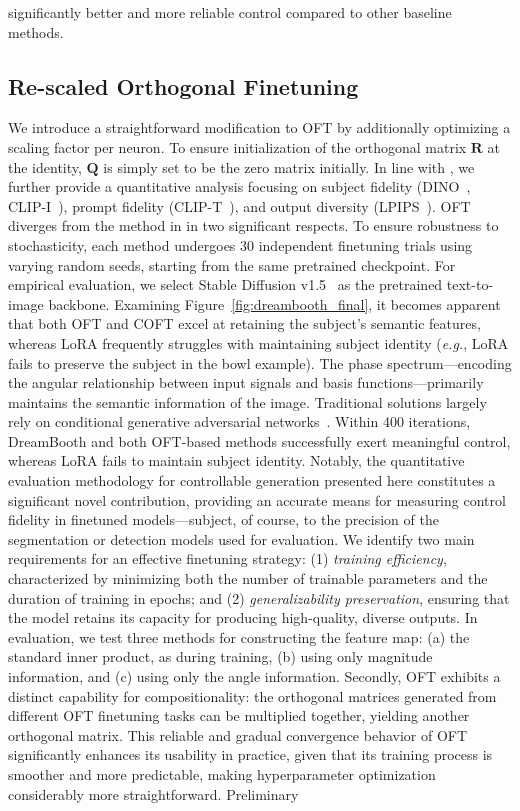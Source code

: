 {significantly better and more reliable control compared to other baseline methods. \subsection{Re-scaled Orthogonal Finetuning}

We introduce a straightforward modification to OFT by additionally optimizing a scaling factor per neuron. To ensure initialization of the orthogonal matrix $\bm{R}$ at the identity, $\bm{Q}$ is simply set to be the zero matrix initially. In line with \cite{ruiz2023dreambooth}, we further provide a quantitative analysis focusing on subject fidelity (DINO~\cite{caron2021emerging}, CLIP-I~\cite{radford2021learning}), prompt fidelity (CLIP-T~\cite{radford2021learning}), and output diversity (LPIPS~\cite{zhang2018unreasonable}). OFT diverges from the method in \cite{liu2021orthogonal} in two significant respects. To ensure robustness to stochasticity, each method undergoes 30 independent finetuning trials using varying random seeds, starting from the same pretrained checkpoint. For empirical evaluation, we select Stable Diffusion v1.5~\cite{rombach2022high} as the pretrained text-to-image backbone. Examining Figure~\ref{fig:dreambooth_final}, it becomes apparent that both OFT and COFT excel at retaining the subject's semantic features, whereas LoRA frequently struggles with maintaining subject identity (\emph{e.g.}, LoRA fails to preserve the subject in the bowl example). The phase spectrum—encoding the angular relationship between input signals and basis functions—primarily maintains the semantic information of the image. Traditional solutions largely rely on conditional generative adversarial networks~\cite{isola2017image,zhu2017toward,wang2018high,park2019semantic,choi2018stargan}. Within 400 iterations, DreamBooth and both OFT-based methods successfully exert meaningful control, whereas LoRA fails to maintain subject identity. Notably, the quantitative evaluation methodology for controllable generation presented here constitutes a significant novel contribution, providing an accurate means for measuring control fidelity in finetuned models—subject, of course, to the precision of the segmentation or detection models used for evaluation. We identify two main requirements for an effective finetuning strategy: (1) \emph{training efficiency}, characterized by minimizing both the number of trainable parameters and the duration of training in epochs; and (2) \emph{generalizability preservation}, ensuring that the model retains its capacity for producing high-quality, diverse outputs. In evaluation, we test three methods for constructing the feature map: (a) the standard inner product, as during training, (b) using only magnitude information, and (c) using only the angle information. Secondly, OFT exhibits a distinct capability for compositionality: the orthogonal matrices generated from different OFT finetuning tasks can be multiplied together, yielding another orthogonal matrix. This reliable and gradual convergence behavior of OFT significantly enhances its usability in practice, given that its training process is smoother and more predictable, making hyperparameter optimization considerably more straightforward. Preliminary }
